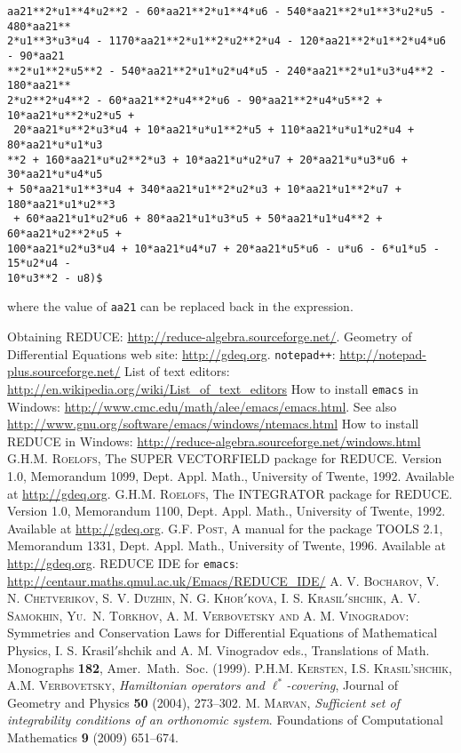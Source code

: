 \documentclass[12pt]{amsart}
\theoremstyle{definition}
\newcommand{\cprime}{\/{\mathsurround=0pt$'$}}
\newcommand{\reduce}{REDUCE\xspace}
\begin{document}
\begin{verbatim}
aa21**2*u1**4*u2**2 - 60*aa21**2*u1**4*u6 - 540*aa21**2*u1**3*u2*u5 - 480*aa21**
2*u1**3*u3*u4 - 1170*aa21**2*u1**2*u2**2*u4 - 120*aa21**2*u1**2*u4*u6 - 90*aa21
**2*u1**2*u5**2 - 540*aa21**2*u1*u2*u4*u5 - 240*aa21**2*u1*u3*u4**2 - 180*aa21**
2*u2**2*u4**2 - 60*aa21**2*u4**2*u6 - 90*aa21**2*u4*u5**2 + 10*aa21*u**2*u2*u5 +
 20*aa21*u**2*u3*u4 + 10*aa21*u*u1**2*u5 + 110*aa21*u*u1*u2*u4 + 80*aa21*u*u1*u3
**2 + 160*aa21*u*u2**2*u3 + 10*aa21*u*u2*u7 + 20*aa21*u*u3*u6 + 30*aa21*u*u4*u5 
+ 50*aa21*u1**3*u4 + 340*aa21*u1**2*u2*u3 + 10*aa21*u1**2*u7 + 180*aa21*u1*u2**3
 + 60*aa21*u1*u2*u6 + 80*aa21*u1*u3*u5 + 50*aa21*u1*u4**2 + 60*aa21*u2**2*u5 + 
100*aa21*u2*u3*u4 + 10*aa21*u4*u7 + 20*aa21*u5*u6 - u*u6 - 6*u1*u5 - 15*u2*u4 - 
10*u3**2 - u8)$
\end{verbatim}
where the value of \texttt{aa21} can be replaced back in the expression.


\begin{thebibliography}{99}

 Obtaining \reduce: \url{http://reduce-algebra.sourceforge.net/}.
   Geometry of Differential Equations web site:
    \url{http://gdeq.org}.
   \texttt{notepad++}:
    \url{http://notepad-plus.sourceforge.net/}
   List of text editors:
    \url{http://en.wikipedia.org/wiki/List_of_text_editors}
   How to install \texttt{emacs} in Windows:
    \url{http://www.cmc.edu/math/alee/emacs/emacs.html}. See also
    \url{http://www.gnu.org/software/emacs/windows/ntemacs.html}
   How to install \reduce in Windows:
    \url{http://reduce-algebra.sourceforge.net/windows.html}
   \textsc{G.H.M. Roelofs}, The SUPER VECTORFIELD package for
    REDUCE. Version 1.0, Memorandum 1099, Dept. Appl. Math., University of
    Twente, 1992. Available at \url{http://gdeq.org}.
   \textsc{G.H.M. Roelofs}, The INTEGRATOR package for
    REDUCE. Version 1.0, Memorandum 1100, Dept. Appl. Math., University of
    Twente, 1992. Available at \url{http://gdeq.org}.
   \textsc{G.F. Post}, A manual for the package TOOLS 2.1,
    Memorandum 1331, Dept. Appl. Math., University of Twente, 1996. Available
    at \url{http://gdeq.org}.
   \reduce IDE for \texttt{emacs}:
    \url{http://centaur.maths.qmul.ac.uk/Emacs/REDUCE_IDE/}
   \textsc{A. V. Bocharov, V. N. Chetverikov, S. V.  Duzhin, N.
      G.  Khor{\cprime}kova, I. S.  Krasil{\cprime}shchik, A.  V.  Samokhin,
      Yu.\ N.  Torkhov, A. M. Verbovetsky and A. M.  Vinogradov}: Symmetries
    and Conservation Laws for Differential Equations of Mathematical Physics,
    I.  S.  Krasil{\cprime}shchik and A. M.  Vinogradov eds., Translations of
    Math.  Monographs \textbf{182}, Amer.\ Math.\ Soc. (1999).
   \textsc{P.H.M. Kersten, I.S. Krasil'shchik, A.M. Verbovetsky,}
    \emph{Hamiltonian operators and $\ell^*$-covering}, Journal of Geometry and
    Physics \textbf{50} (2004), 273--302.
   \textsc{M. Marvan}, \emph{Sufficient set of integrability
    conditions of an orthonomic system}.  Foundations of Computational
    Mathematics \textbf{9} (2009) 651--674.
\end{thebibliography}
\end{document}

